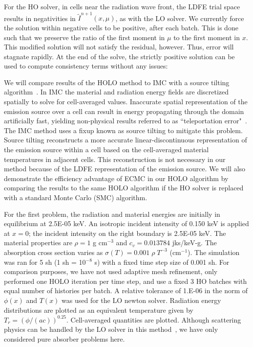 \documentclass{mc2013}
\begin{document}

For the HO solver, in cells near the radiation wave front, the LDFE trial space results in negativities in
$\tilde{I}^{n+1}(x,\mu)$, as with the
LO solver.  We currently force the solution within negative cells to be
positive, after each batch. This is done such that we preserve the ratio of the
first moment in $\mu$ to the first moment in $x$. This modified solution will
not satisfy the residual, however.  Thus, error will stagnate rapidly.  At the
end of the solve, the strictly positive solution can be used to compute consistency terms without any issues:


We will compare results of the HOLO method to IMC with
a source tilting algorithm~\cite{jayenne}. In IMC the material and radiation energy fields are discretized spatially to solve for cell-averaged values.
Inaccurate spatial representation of the emission source over a cell can result in
energy propagating through the domain artificially fast, yielding non-physical
results referred to as ``teleportation error"~\cite{teleportation}.  The IMC method uses a fixup known as source tilting
to mitigate this problem.  Source tilting reconstructs a more accurate
linear-discontinuous representation of the
emission source within a cell based on the cell-averaged material temperatures in adjacent
cells. This reconstruction is not necessary in our method because of the LDFE representation of the
emission source. We will also demonstrate the efficiency advantage of ECMC in our HOLO
algorithm by comparing the results to the same HOLO algorithm if the HO solver
is replaced with a standard Monte Carlo (SMC) algorithm.




For the first problem, the radiation and material energies are initially in
equilibrium at 2.5E-05 keV.   An isotropic incident intensity of 0.150 keV is applied
at $x=0$; the incident intensity on the right boundary is 2.5E-05 keV.
The material properties are $\rho = 1$ g cm$^{-3}$ and $c_v = 0.013784$ jks/keV-g. The
absorption cross section varies as $\sigma(T) = 0.001\;\rho\; T^{-3}$ (cm$^{-1}$). The simulation was ran for 5 sh (1 sh =
10$^{-8}$ s) with a fixed time step size of 0.001 sh. For comparison purposes, we
have not used adaptive mesh
refinement, only performed one HOLO iteration per time
step, and use a fixed 3 HO batches with equal number of histories per batch. A relative tolerance of 1.E-06 in the
norm of $\phi(x)$ and $T(x)$ was used for the LO newton solver. Radiation energy
distributions are plotted as an equivalent temperature given by
$T_r=(\phi/(ac))^{0.25}$.  Cell-averaged quantities are plotted.
Although scattering physics
can be handled by the LO solver in this method~\cite{ans_2014}, we have only considered pure absorber
problems here.  
\end{document}
